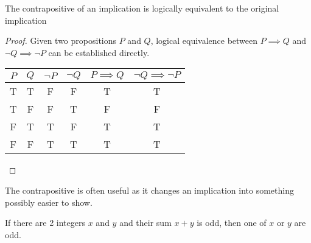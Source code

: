 \documentclass[../notes.tex]{subfiles}
\begin{document}
\begin{theorem}[Contrapositive]
	The contrapositive of an implication is logically equivalent to the original implication
\end{theorem}
\begin{proof}
	Given two propositions $P$ and $Q$, logical equivalence between $P \implies Q $ and $ \lnot Q \implies \lnot P$ can be established directly.

	\begin{center}
	  \begin{tabular}{c c || c c || c | c}
	  	$P$ & $Q$ & $\lnot P$ & $\lnot Q$ & $P \implies Q$ & $\lnot Q \implies \lnot P$ \\\hline
	  	T & T & F & F & T & T \\
	  	T & F & F & T & F & F \\
	  	F & T & T & F & T & T \\
	  	F & F & T & T & T & T \\
	  \end{tabular}
	\end{center}
\end{proof}

The contrapositive is often useful as it changes an implication into something possibly easier to show.

\begin{theorem}
	If there are 2 integers $x$ and $y$ and their sum $x+y$ is odd, then one of $x$ or $y$ are odd.
\end{theorem}
\end{document}
